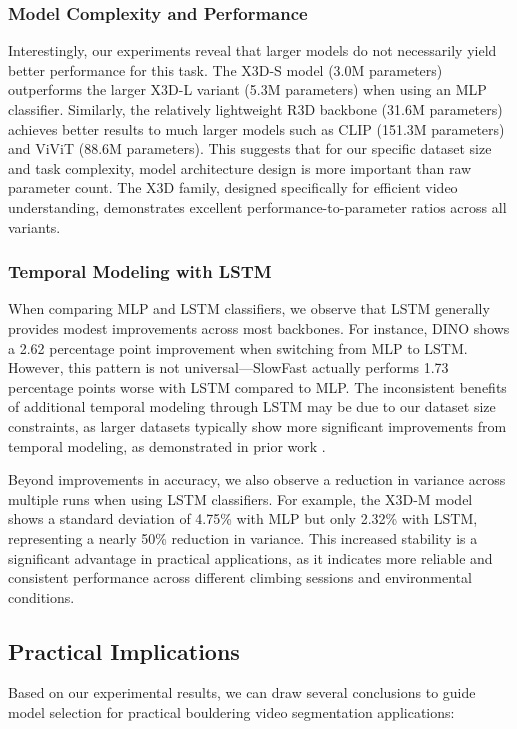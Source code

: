 \subsubsection{Model Complexity and Performance}
Interestingly, our experiments reveal that larger models do not necessarily yield better performance for this task. The X3D-S model (3.0M parameters) outperforms the larger X3D-L variant (5.3M parameters) when using an MLP classifier. Similarly, the relatively lightweight R3D backbone (31.6M parameters) achieves better results to much larger models such as CLIP (151.3M parameters) and ViViT (88.6M parameters). This suggests that for our specific dataset size and task complexity, model architecture design is more important than raw parameter count. The X3D family, designed specifically for efficient video understanding, demonstrates excellent performance-to-parameter ratios across all variants.

\subsubsection{Temporal Modeling with LSTM}
When comparing MLP and LSTM classifiers, we observe that LSTM generally provides modest improvements across most backbones. For instance, DINO shows a 2.62 percentage point improvement when switching from MLP to LSTM. However, this pattern is not universal—SlowFast actually performs 1.73 percentage points worse with LSTM compared to MLP. The inconsistent benefits of additional temporal modeling through LSTM may be due to our dataset size constraints, as larger datasets typically show more significant improvements from temporal modeling, as demonstrated in prior work \cite{example-paper-doing-temporal-modeling}.

Beyond improvements in accuracy, we also observe a reduction in variance across multiple runs when using LSTM classifiers. For example, the X3D-M model shows a standard deviation of 4.75\% with MLP but only 2.32\% with LSTM, representing a nearly 50\% reduction in variance. This increased stability is a significant advantage in practical applications, as it indicates more reliable and consistent performance across different climbing sessions and environmental conditions.

\subsection{Practical Implications}
Based on our experimental results, we can draw several conclusions to guide model selection for practical bouldering video segmentation applications:

